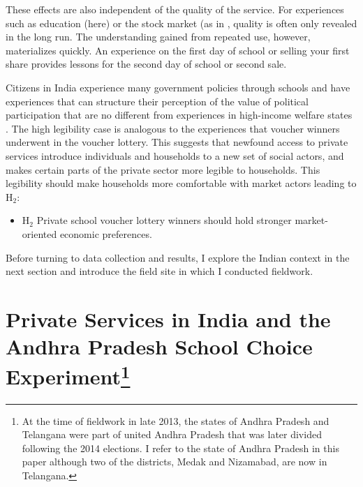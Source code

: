 \documentclass[hidelinks, 12pt, titlepage]{article}
\begin{document}
These effects are also independent of the quality of the service.  For experiences such as education (here) or the stock market (as in \cite{Margalit2020}, quality is often only revealed in the long run. The understanding gained from repeated use, however, materializes quickly. An experience on the first day of school or selling your first share provides lessons for the second day of school or second sale.

Citizens in India experience many government policies through schools and have experiences that can structure their perception of the value of political participation that are no different from experiences in high-income welfare states \citep{Kumlin2004}.  The high legibility case is analogous to the experiences that voucher winners underwent in the voucher lottery.  This suggests that newfound access to private services introduce individuals and households to a new set of social actors, and makes certain parts of the private sector more legible to households.  This legibility should make households more comfortable with market actors leading to H$_{2}$:

\begin{itemize}
\item H$_{2}$ Private school voucher lottery winners should hold stronger market-oriented economic preferences.
\end{itemize}

Before turning to data collection and results, I explore the Indian context in the next section and introduce the field site in which I conducted fieldwork.

\section*{Private Services in India and the Andhra Pradesh School Choice Experiment\label{section:context}\footnote{At the time of fieldwork in late 2013, the states of Andhra Pradesh and Telangana were part of united Andhra Pradesh that was later divided following the 2014 elections.  I refer to the state of Andhra Pradesh in this paper although two of the districts, Medak and Nizamabad, are now in Telangana.}}
\end{document}
